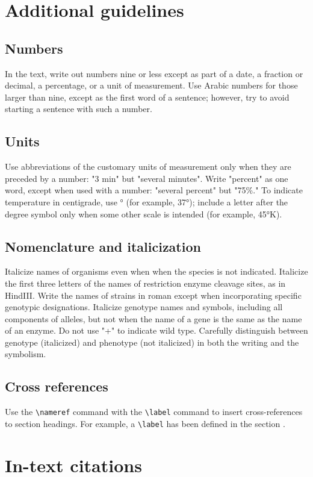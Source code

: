 \documentclass[10pt,twocolumn,twoside,lineno]{gsajnl}
\begin{document}
\section{Additional guidelines}

\subsection{Numbers} In the text, write out numbers nine or less except as part of a date, a fraction or decimal, a percentage, or a unit of measurement. Use Arabic numbers for those larger than nine, except as the first word of a sentence; however, try to avoid starting a sentence with such a number.

\subsection{Units} Use abbreviations of the customary units of measurement only when they are preceded by a number: "3 min" but "several minutes". Write "percent" as one word, except when used with a number: "several percent" but "75\%." To indicate temperature in centigrade, use ° (for example, 37°); include a letter after the degree symbol only when some other scale is intended (for example, 45°K).

\subsection{Nomenclature and italicization} Italicize names of organisms even when  when the species is not indicated.  Italicize the first three letters of the names of restriction enzyme cleavage sites, as in HindIII. Write the names of strains in roman except when incorporating specific genotypic designations. Italicize genotype names and symbols, including all components of alleles, but not when the name of a gene is the same as the name of an enzyme. Do not use "+" to indicate wild type. Carefully distinguish between genotype (italicized) and phenotype (not italicized) in both the writing and the symbolism.

\subsection{Cross references}
Use the \verb|\nameref| command with the \verb|\label| command to insert cross-references to section headings. For example, a \verb|\label| has been defined in the section .

\section{In-text citations}
\end{document}
